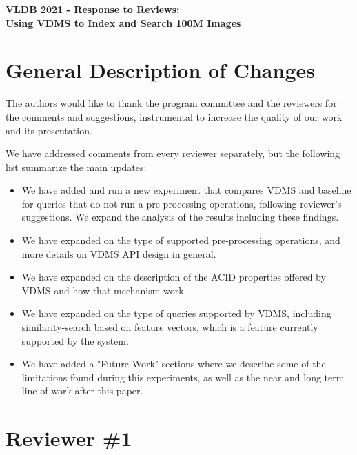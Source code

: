 \documentclass[11pt]{proposalnsf}
\begin{document}
\begin{center}
{\Large{\bf VLDB 2021 - Response to Reviews: \\
Using VDMS to Index and Search 100M Images}}

\end{center}

\section{General Description of Changes}

The authors would like to thank the program committee and the reviewers
for the comments and suggestions,
instrumental to increase the quality of our work and its presentation.

We have addressed comments from every reviewer separately, but the following
list summarize the main updates:

\begin{itemize}
  \item We have added and run a new experiment that compares VDMS and baseline
        for queries that do not run a pre-processing operations, following
        reviewer's suggestions.
        We expand the analysis of the results including these findings.
  \item We have expanded on the type of supported pre-processing
        operations, and more details on VDMS API design in general.
  \item We have expanded on the description of the ACID properties offered
        by VDMS and how that mechanism work.
  \item We have expanded on the type of queries supported by VDMS,
        including similarity-search based on feature vectors,
        which is a feature currently supported by the system.
  \item We have added a "Future Work" sections where we describe some
        of the limitations found during this experiments, as well as the
        near and long term line of work after this paper.
\end{itemize}

\section{Reviewer \#1}
\end{document}
